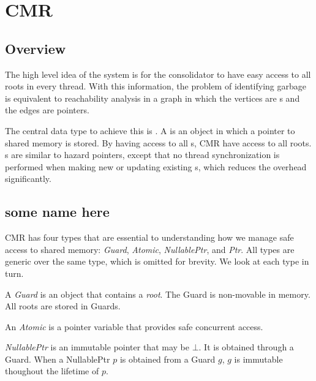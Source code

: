 \chapter{CMR}

\section{Overview}

The high level idea of the system is for the consolidator to have easy access to all roots in every
thread. With this information, the problem of identifying garbage is equivalent to reachability
analysis in a graph in which the vertices are s and the edges are pointers.

The central data type to achieve this is . A  is an object in which a
pointer to shared memory is stored. By having access to all s, CMR have access to all
roots. s are similar to hazard pointers, except that no thread synchronization is
performed when making new or updating existing s, which reduces the overhead
significantly.

\vspace{2cm}


\section{some name here}

CMR has four types that are essential to understanding how we manage safe access to shared memory:
\emph{Guard}, \emph{Atomic}, \emph{NullablePtr}, and \emph{Ptr}. All types are generic over the
same type, which is omitted for brevity. We look at each type in turn.

\begin{definition}[Guard]
  A \emph{Guard} is an object that contains a \emph{root}. The Guard is non-movable in memory.
  All roots are stored in Guards.
\end{definition}

\begin{definition}[Atomic]
  An \emph{Atomic} is a pointer variable that provides safe concurrent access.
\end{definition}

\begin{definition}[NullablePtr]
  \emph{NullablePtr} is an immutable pointer that may be $\bot$. It is obtained through a Guard.
  When a NullablePtr $p$ is obtained from a Guard $g$, $g$ is immutable thoughout the lifetime of
  $p$.
\end{definition}


